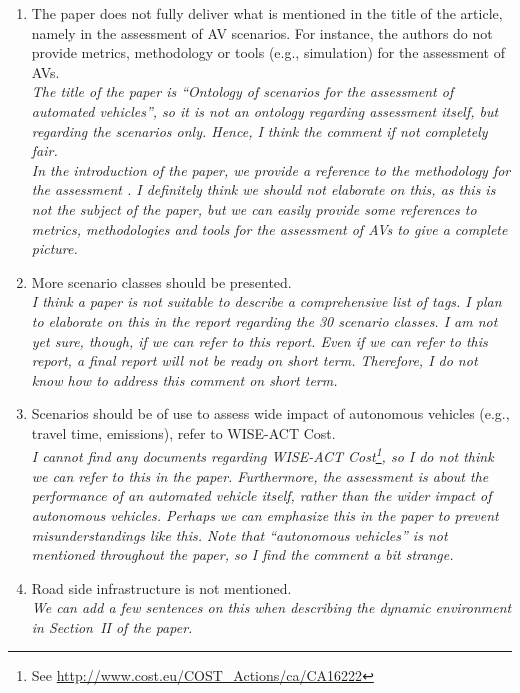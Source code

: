 \documentclass[10pt,final,a4paper,oneside,onecolumn]{article}
\begin{document}
\begin{itemize}
\begin{enumerate}
		\item The paper does not fully deliver what is mentioned in the	title of the article, namely in the assessment of AV	scenarios. For instance, the authors do not provide metrics, methodology or tools (e.g., simulation) for the	assessment of AVs. \\
		\textit{The title of the paper is ``Ontology of scenarios for the assessment of automated vehicles'', so it is not an ontology regarding assessment itself, but regarding the scenarios only. Hence, I think the comment if not completely fair.\\
		In the introduction of the paper, we provide a reference to the methodology for the assessment \cite{stellet2015taxonomy}. I definitely think we should not elaborate on this, as this is not the subject of the paper, but we can easily provide some references to metrics, methodologies and tools for the assessment of AVs to give a complete picture.}
		
		\item More scenario classes should be presented.\\
		\textit{I think a paper is not suitable to describe a comprehensive list of tags. I plan to elaborate on this in the report regarding the 30 scenario classes. I am not yet sure, though, if we can refer to this report. Even if we can refer to this report, a final report will not be ready on short term. Therefore, I do not know how to address this comment on short term.}
		
		\item Scenarios should be of use to assess wide impact of autonomous vehicles (e.g., travel time, emissions), refer to WISE-ACT Cost.\\
		\textit{I cannot find any documents regarding WISE-ACT Cost\footnote{See \url{http://www.cost.eu/COST_Actions/ca/CA16222}}, so I do not think we can refer to this in the paper. Furthermore, the assessment is about the performance of an automated vehicle itself, rather than the wider impact of autonomous vehicles. Perhaps we can emphasize this in the paper to prevent misunderstandings like this. Note that ``autonomous vehicles'' is not mentioned throughout the paper, so I find the comment a bit strange.}
		
		\item Road side infrastructure is not mentioned.\\
		\textit{We can add a few sentences on this when describing the dynamic environment in Section~II of the paper.}
		

\end{enumerate}
\end{itemize}
\end{document}
